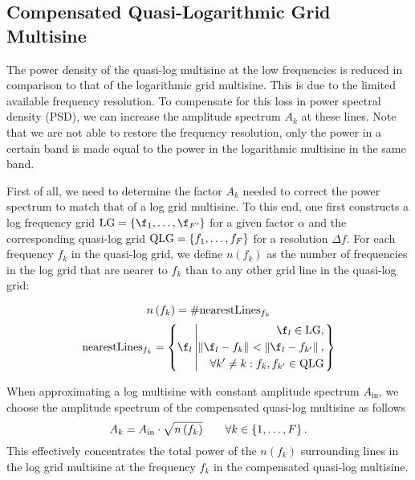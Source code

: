 \subsection{Compensated Quasi-Logarithmic Grid Multisine}
  The power density of the quasi-log multisine at the low frequencies is reduced in comparison to that of the logarithmic grid multisine.
  This is due to the limited available frequency resolution.
  To compensate for this loss in power spectral density (PSD), we can increase the amplitude spectrum $A_k$ at these lines.
  Note that we are not able to restore the frequency resolution, only the power in a certain band is made equal to the power in the logarithmic multisine in the same band.

  First of all, we need to determine the factor $A_k$ needed to correct the power spectrum to match that of a log grid multisine.
  To this end, one first constructs a log frequency grid $\LOGGRID = \set{\f_1, \ldots, \f_{F'}}$ for a given factor $\alpha$ and the corresponding quasi-log grid $\mathrm{QLG} = \left\{f_1, \ldots, f_F\right\}$ for a resolution $\Delta f$.
  For each frequency $f_k$ in the quasi-log grid, we define $n\left(f_k\right)$
  as the number of frequencies in the log grid that are nearer to $f_k$
  than to any other grid line in the quasi-log grid:
  
  \begin{equation}
    n\left(f_k\right) = \# \mathrm{nearestLines}_{f_k}
    \label{eq:nfk}
  \end{equation}
  \begin{equation}
    \mathrm{nearestLines}_{f_k} =
      \left\{ 
        \f_l \given{\begin{aligned} 
                       \f_l \in \LOGGRID, \\
                       \norm{\f_l - f_k} < \norm{\f_l - f_{k'}},\\
                       \forall k' \neq k: f_k, f_{k'} \in \QLOGGRID
                    \end{aligned}}
      \right\}
    \label{eq:nearestLines}
  \end{equation}  
  
  When approximating a log multisine with constant amplitude spectrum $A_{\mathrm{in}}$, we choose the amplitude spectrum of the compensated quasi-log multisine as follows
  \begin{equation}
    A_k = A_{\mathrm{in}} \cdot \sqrt{n\left(f_k\right)}\qquad \forall k \in \left\{1,\ldots,F\right\}
  \text{.}
  \label{eq:compensationAk}
  \end{equation}
  This effectively concentrates the total power of the $n\left( f_k \right)$ surrounding lines in the log grid multisine at the frequency $f_k$ in the compensated quasi-log multisine.
  
